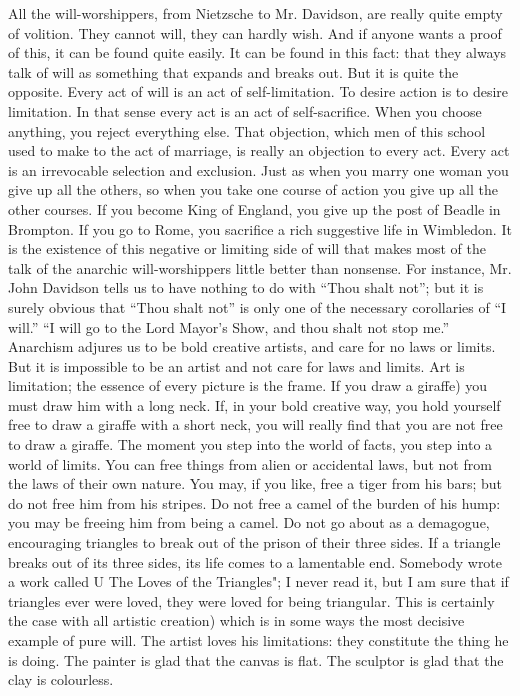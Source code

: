 \documentclass{book}
\begin{document}
All the will-worshippers, from Nietzsche to Mr. Davidson, are really quite empty of volition. They cannot will, they can hardly wish. And if anyone wants a proof of this, it can be found quite easily. It can be found in this fact: that they always talk of will as something that expands and breaks out. But it is quite the opposite. Every act of will is an act of self-limitation. To desire action is to desire limitation. In that sense every act is an act of self-sacrifice. When you choose anything, you reject everything else. That objection, which men of this school used to make to the act of marriage, is really an objection to every act. Every act is an irrevocable selection and exclusion. Just as when you marry one woman you give up all the others, so when you take one course of action you give up all the other courses. If you become King of England, you give up the post of Beadle in Brompton. If you go to Rome, you sacrifice a rich suggestive life in Wimbledon. It is the existence of this negative or limiting side of will that makes most of the talk of the anarchic will-worshippers little better than nonsense. For instance, Mr. John Davidson tells us to have nothing to do with “Thou shalt not”; but it is surely obvious that “Thou shalt not” is only one of the necessary corollaries of “I will.” “I will go to the Lord Mayor’s Show, and thou shalt not stop me.” Anarchism adjures us to be bold creative artists, and care for no laws or limits. But it is impossible to be an artist and not care for laws and limits. Art is limitation; the essence of every picture is the frame. If you draw a giraffe) you must draw him with a long neck. If, in your bold creative way, you hold yourself free to draw a giraffe with a short neck, you will really find that you are not free to draw a giraffe. The moment you step into the world of facts, you step into a world of limits. You can free things from alien or accidental laws, but not from the laws of their own nature. You may, if you like, free a tiger from his bars; but do not free him from his stripes. Do not free a camel of the burden of his hump: you may be freeing him from being a camel. Do not go about as a demagogue, encouraging triangles to break out of the prison of their three sides. If a triangle breaks out of its three sides, its life comes to a lamentable end. Somebody wrote a work called U The Loves of the Triangles"; I never read it, but I am sure that if triangles ever were loved, they were loved for being triangular. This is certainly the case with all artistic creation) which is in some ways the most decisive example of pure will. The artist loves his limitations: they constitute the thing he is doing. The painter is glad that the canvas is flat. The sculptor is glad that the clay is colourless.
\end{document}
